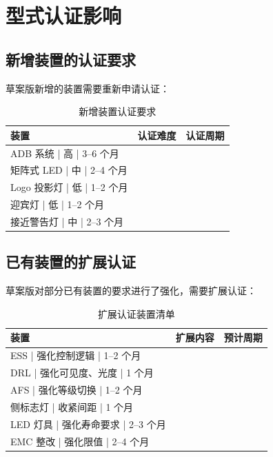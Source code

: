 \section{型式认证影响}

\subsection{新增装置的认证要求}

草案版新增的装置需要重新申请认证：

\begin{table}[H]
\centering
\caption{新增装置认证要求}
\begin{tabular}{|l|c|c|}
\hline
\textbf{装置} & \textbf{认证难度} & \textbf{认证周期} \\
\hline
ADB 系统       | 高      | 3--6 个月 \\
\hline
矩阵式 LED      | 中      | 2--4 个月 \\
\hline
Logo 投影灯     | 低      | 1--2 个月 \\
\hline
迎宾灯         | 低      | 1--2 个月 \\
\hline
接近警告灯      | 中      | 2--3 个月 \\
\hline
\end{tabular}
\end{table}

\subsection{已有装置的扩展认证}

草案版对部分已有装置的要求进行了强化，需要扩展认证：

\begin{table}[H]
\centering
\caption{扩展认证装置清单}
\begin{tabular}{|l|c|c|}
\hline
\textbf{装置} & \textbf{扩展内容} & \textbf{预计周期} \\
\hline
ESS           | 强化控制逻辑       | 1--2 个月 \\
\hline
DRL           | 强化可见度、光度       | 1 个月 \\
\hline
AFS           | 强化等级切换       | 1--2 个月 \\
\hline
侧标志灯      | 收紧间距          | 1 个月 \\
\hline
LED 灯具      | 强化寿命要求        | 2--3 个月 \\
\hline
EMC 整改      | 强化限值          | 2--4 个月 \\
\hline
\end{tabular}
\end{table}

